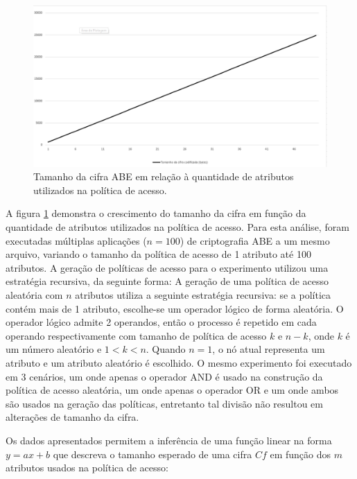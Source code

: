 \documentclass[a4paper,11pt]{article}
\begin{document}
\begin{figure}[!h]
  \centering
  \includegraphics[width=\textwidth]{images/resultados-tamanho-cifra-crescimento.png}
  \caption{Tamanho da cifra ABE em relação à quantidade de atributos utilizados na política de acesso.}
  \label{fig:crescimento-cifra}
\end{figure}

A figura \ref{fig:crescimento-cifra} demonstra o crescimento do tamanho da cifra em função da quantidade de atributos utilizados na política de acesso. Para esta análise, foram executadas múltiplas aplicações ($n=100$) de criptografia ABE a um mesmo arquivo, variando o tamanho da política de acesso de 1 atributo até 100 atributos.
A geração de políticas de acesso para o experimento utilizou uma estratégia recursiva, da seguinte forma:
A geração de uma política de acesso aleatória com $n$ atributos utiliza a seguinte estratégia recursiva:
se a política contém mais de 1 atributo, escolhe-se um operador lógico de forma aleatória.
O operador lógico admite 2 operandos, então o processo é repetido em cada operando respectivamente com tamanho de política de acesso $k$ e $n-k$, onde $k$ é um número aleatório e $1 < k < n$.
Quando $n = 1$, o nó atual representa um atributo e um atributo aleatório é escolhido.
O mesmo experimento foi executado em 3 cenários, um onde apenas o operador AND é usado na construção da política de acesso aleatória, um onde apenas o operador OR e um onde ambos são usados na geração das políticas, entretanto tal divisão não resultou em alterações de tamanho da cifra.

Os dados apresentados permitem a inferência de uma função linear na forma $y = ax + b$ que descreva o tamanho esperado de uma cifra $Cf$ em função dos $m$ atributos usados na política de acesso:
\end{document}
